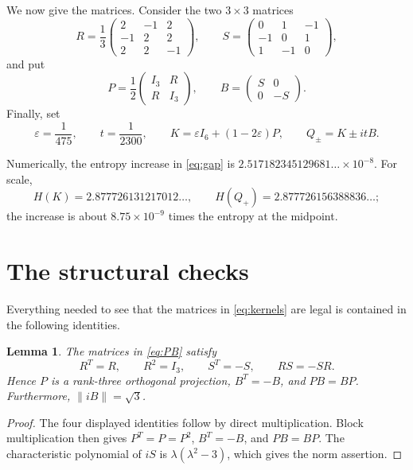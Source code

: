 \documentclass[11pt]{article}
\newtheorem{lemma}{Lemma}
\begin{document}
We now give the matrices.  Consider
the two $3\times3$ matrices
\[
 R=\frac13
 \begin{pmatrix}
  2&-1& 2\\
 -1& 2& 2\\
  2& 2&-1
 \end{pmatrix},
 \qquad
 S=\begin{pmatrix}
 0&1&-1\\
 -1&0&1\\
 1&-1&0
 \end{pmatrix},
\]
and put
\begin{equation}\label{eq:PB}
 P=\frac12\begin{pmatrix}I_3&R\\ R&I_3\end{pmatrix},
 \qquad
 B=\begin{pmatrix}S&0\\0&-S\end{pmatrix}.
\end{equation}
Finally, set
\begin{equation}\label{eq:kernels}
 \varepsilon=\frac1{475},\qquad
 t=\frac1{2300},\qquad
 K=\varepsilon I_6+(1-2\varepsilon)P,
 \qquad Q_\pm=K\pm itB.
\end{equation}

Numerically, the entropy increase in \eqref{eq:gap} is
$2.517182345129681\ldots\times10^{-8}$.  For scale,
\[
 H(K)=2.877726131217012\ldots,\qquad
 H(Q_+)=2.877726156388836\ldots;
\]
the increase is about $8.75\times10^{-9}$ times the entropy at the midpoint.

\section{The structural checks}

Everything needed to see that the matrices in \eqref{eq:kernels} are legal is
contained in the following identities.

\begin{lemma}\label{lem:structure}
The matrices in \eqref{eq:PB} satisfy
\[
 R^T=R,\qquad R^2=I_3,\qquad
 S^T=-S,\qquad RS=-SR.
\]
Hence $P$ is a rank-three orthogonal projection, $B^T=-B$, and $PB=BP$.
Furthermore, $\lVert iB\rVert=\sqrt3$.
\end{lemma}

\begin{proof}
The four displayed identities follow by direct multiplication.  Block
multiplication then gives $P^T=P=P^2$, $B^T=-B$, and $PB=BP$.  The
characteristic polynomial of $iS$ is
$\lambda(\lambda^2-3)$, which gives the norm assertion.
\end{proof}
\end{document}
